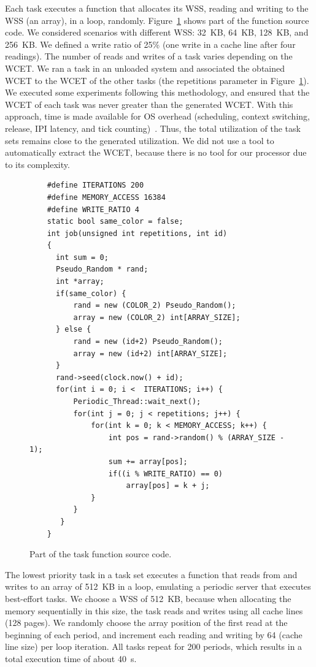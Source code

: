 \documentclass[10pt, conference, compsocconf]{IEEEtran}
\begin{document}
Each task executes a function that allocates its WSS, reading and writing to the WSS (an array), in a loop, randomly. Figure~\ref{prg:app} shows part of the function source code. We considered scenarios with different WSS: 32~KB, 64~KB, 128~KB, and 256~KB. We defined a write ratio of 25\% (one write in a cache line after four readings). The number of reads and writes of a task varies depending on the WCET. We ran a task in an unloaded system and associated the obtained WCET to the WCET of the other tasks (the repetitions parameter in Figure~\ref{prg:app}). We executed some experiments following this methodology, and ensured that the WCET of each task was never greater than the generated WCET. With this approach, time is made available for OS overhead (scheduling, context switching, release, IPI latency, and tick counting)~\cite{Gracioli:2013}. Thus, the total utilization of the task sets remains close to the generated utilization. We did not use a tool to automatically extract the WCET, because there is no tool for our processor due to its complexity.

\begin{figure}[!ht]
\lstset{language=C++,style=prg,basicstyle=\tiny}
\begin{lstlisting}
    #define ITERATIONS 200
    #define MEMORY_ACCESS 16384
    #define WRITE_RATIO 4
    static bool same_color = false;
    int job(unsigned int repetitions, int id)
    {
      int sum = 0;
      Pseudo_Random * rand;
      int *array;
      if(same_color) {
          rand = new (COLOR_2) Pseudo_Random();
          array = new (COLOR_2) int[ARRAY_SIZE];
      } else {
          rand = new (id+2) Pseudo_Random();
          array = new (id+2) int[ARRAY_SIZE];
      }
      rand->seed(clock.now() + id);
      for(int i = 0; i <  ITERATIONS; i++) {
          Periodic_Thread::wait_next();
          for(int j = 0; j < repetitions; j++) {
              for(int k = 0; k < MEMORY_ACCESS; k++) {
                  int pos = rand->random() % (ARRAY_SIZE - 1);
                  sum += array[pos];
                  if((i % WRITE_RATIO) == 0)
                      array[pos] = k + j;
              }
          }
       }
    }
\end{lstlisting}
\caption{Part of the task function source code.}
\label{prg:app}
\end{figure}

The lowest priority task in a task set executes a function that reads from and writes to an array of 512~KB in a loop, emulating a periodic server that executes best-effort tasks. We choose a WSS of 512~KB, because when allocating the memory sequentially in this size, the task reads and writes using all cache lines (128 pages). We randomly choose the array position of the first read at the beginning of each period, and increment each reading and writing by 64 (cache line size) per loop iteration. All tasks repeat for 200 periods, which results in a total execution time of about 40~\si{\second}.
\end{document}
